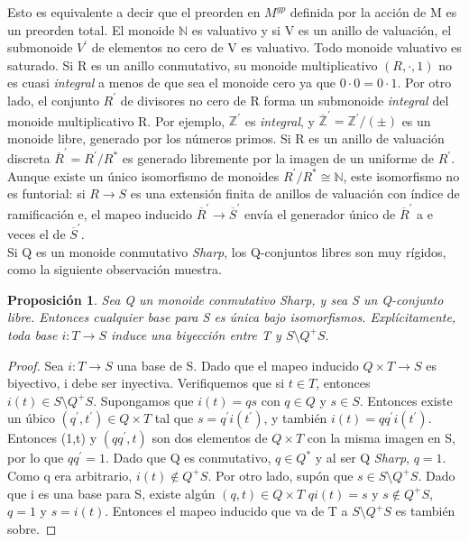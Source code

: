 \documentclass[12pt,spanish]{amsart}
\newcommand{\bb}[1]{\mathbb{#1}}
\newtheorem{prop}[Theorem]{Proposición}
\theoremstyle{definition}
\theoremstyle{remark}
\begin{document}
Esto es equivalente a decir que el preorden en $M^{gp}$ definida por la acción de M es un preorden total. El monoide $\bb{N}$ es valuativo y si V es un anillo de valuación, el submonoide $V^{\prime}$ de elementos no cero de V es valuativo. Todo monoide valuativo es saturado. 
Si R es un anillo conmutativo, su monoide multiplicativo $(R,\cdot,1)$ no es cuasi \textit{integral} a menos de que sea el monoide cero ya que $0\cdot 0 = 0 \cdot 1$. Por otro lado, el conjunto $R^{\prime}
$ de divisores no cero de R forma un submonoide \textit{integral} del monoide multiplicativo R. Por ejemplo, $\bb{Z}^{\prime}$ es \textit{integral}, y $\overline{\bb{Z}}^{\prime} = \bb{Z}^{\prime}/(\pm)$ es un monoide libre, generado por los números primos. Si R es un anillo de valuación discreta $\overline{R}^{\prime}=R^{\prime}/ R^{\ast}$ es generado libremente por la imagen de un uniforme de $R^{\prime}$. Aunque existe un único isomorfismo de monoides $R^{\prime}/ R^{\ast} \cong \bb{N}$, este isomorfismo no es funtorial: si $R \to S$ es una extensión finita de anillos de valuación con índice de ramificación e, el mapeo inducido $\overline{R}^{\prime} \to \overline{S}^{\prime}$ envía el generador único de $\overline{R}^{\prime}$ a e veces el de $\overline{S}^{\prime}$. \\
Si Q es un monoide conmutativo \textit{Sharp}, los Q-conjuntos libres son muy rígidos, como la siguiente observación muestra. 

\begin{prop}
Sea Q un monoide conmutativo \textit{Sharp}, y sea S un Q-conjunto libre. Entonces cualquier base para S es única bajo isomorfismos. Explícitamente, toda base $i:T \to S$ induce una biyección entre T y $S\setminus Q^{+}S.$
\end{prop}

\begin{proof}
Sea $i:T \to S$ una base de S. Dado que el mapeo inducido $Q\times T \to S$ es biyectivo, i debe ser inyectiva. Verifiquemos que si $t\in T$, entonces $i(t)\in S\setminus Q^{+}S.$ Supongamos que $i(t)=qs$ con $q\in Q$ y $s\in S$. Entonces existe un úbico $(q^{\prime},t^{\prime})\in Q\times T$ tal que $s=q^{\prime}i(t^{\prime})$, y también $i(t)=qq^{\prime}i(t^{\prime})$. Entonces (1,t) y $(qq^{\prime},t)$ son dos elementos de $Q\times T$ con la misma imagen en S, por  lo que $qq^{\prime}=1$. Dado que Q es conmutativo, $q\in Q^{\ast}$ y al ser Q \textit{Sharp}, $q=1$. Como q era arbitrario, $i(t)\notin Q^{+}S$. Por otro lado, supón que $s\in S\setminus Q^{+}S$. Dado que i es una base para S, existe algún $(q,t)\in Q\times T$ $qi(t)=s$ y $s\notin Q^{+}S$, $q=1$ y $s=i(t)$. Entonces el mapeo inducido que va de T a $S \setminus Q^{+}S$ es también sobre.  
\end{proof}
\end{document}
